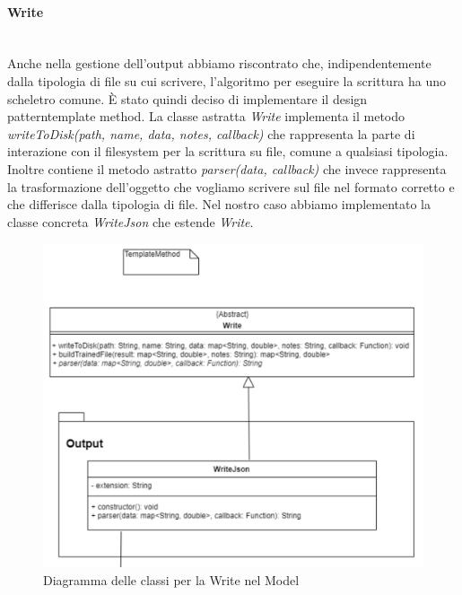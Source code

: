 		\paragraph*{Write} \mbox{} \\[1mm]
		Anche nella gestione dell'output abbiamo riscontrato che, indipendentemente dalla tipologia di file su cui scrivere, l'algoritmo per eseguire la scrittura ha uno scheletro comune. È stato quindi deciso di implementare il design pattern\glosp template method.
		La classe astratta \textit{Write} implementa il metodo \textit{writeToDisk(path, name, data, notes, callback)} che rappresenta la parte di interazione con il filesystem per la scrittura su file, comune a qualsiasi tipologia. Inoltre contiene il metodo astratto \textit{parser(data, callback)} che invece rappresenta la trasformazione dell'oggetto che vogliamo scrivere sul file nel formato corretto e che differisce dalla tipologia di file. Nel nostro caso abbiamo implementato la classe concreta \textit{WriteJson} che estende \textit{Write}.
		\mbox{}
				\begin{figure} [H]
					\begin{center}
						\includegraphics[width=120mm]{img/Diagrammi/write-app.png}
					\end{center}
					\caption{Diagramma delle classi per la Write nel Model}
				\end{figure}

